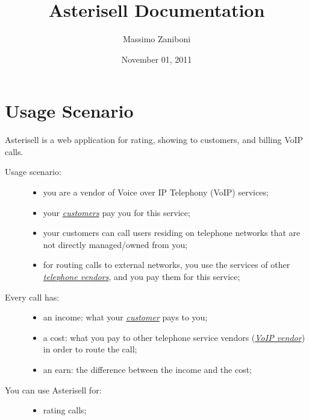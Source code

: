 \documentclass[letterpaper,10pt,english]{sphinxmanual}
\title{Asterisell Documentation}
\date{November 01, 2011}
\author{Massimo Zaniboni}
\begin{document}
\maketitle
\tableofcontents
{}\label{index::doc}



\chapter{Usage Scenario}
\label{index:asterisell-overview}\label{index:usage-scenario}
Asterisell is a web application for rating, showing to customers, and billing VoIP calls.
\begin{description}
\item[{Usage scenario:}] \leavevmode\begin{itemize}
\item {} 
you are a vendor of Voice over IP Telephony (VoIP) services;

\item {} 
your {\hyperref[index:term-customer]{\emph{customers}}} pay you for this service;

\item {} 
your customers can call users residing on telephone networks that are not directly managed/owned from you;

\item {} 
for routing calls to external networks, you use the services of other {\hyperref[index:term-voip-vendor]{\emph{telephone vendors}}}, and you pay them for this service;

\end{itemize}

\item[{Every call has:}] \leavevmode\begin{itemize}
\item {} 
an income: what your {\hyperref[index:term-customer]{\emph{customer}}} pays to you;

\item {} 
a cost: what you pay to other telephone service vendors ({\hyperref[index:term-voip-vendor]{\emph{VoIP vendor}}}) in order to route the call;

\item {} 
an earn: the difference between the income and the cost;

\end{itemize}

\item[{You can use Asterisell for:}] \leavevmode\begin{itemize}
\item {} 
rating calls;


\end{itemize}
\end{description}
\end{document}
